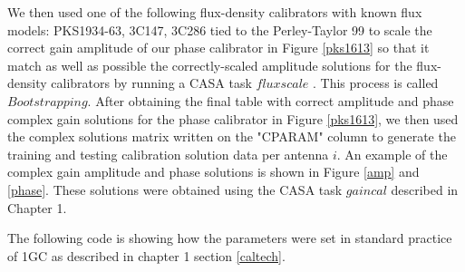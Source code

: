 We then used one of the following flux-density calibrators with known flux models: PKS1934-63, 3C147, 3C286 tied to the Perley-Taylor 99 to scale the correct gain amplitude of our phase calibrator in Figure \ref{pks1613} so that it match as well as possible the correctly-scaled amplitude solutions for the flux-density calibrators by running a CASA task $\textit{fluxscale}$ \citep{CosmoAIMS}. This process is called $\textit{Bootstrapping}$. After obtaining the final table with correct amplitude and phase complex gain solutions for the phase calibrator in Figure \ref{pks1613}, we then used the complex solutions matrix written on the "CPARAM" column to generate the training and testing calibration solution data per antenna $i$. An example of the complex gain amplitude and phase solutions is shown in Figure \ref{amp} and \ref{phase}. These solutions were obtained using the CASA task $gaincal$ described in Chapter 1. 

The following code is showing how the parameters were set in standard practice of 1GC as described in chapter 1 section \ref{caltech}.

